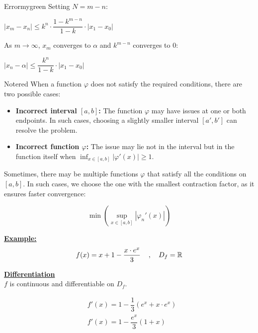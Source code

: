 \begin{prettyBox}{Error}{mygreen}
Setting \(N = m-n\):

\begin{center}
    \(|x_m - x_n| \leq k^{n} \cdot \dfrac{1-k^{m-n}}{1-k} \cdot| x_{1} - x_0|\)
\end{center}

As \(m \to \infty\), \(x_m\) converges to \(\alpha\) and \(k^{m-n}\) converges to 0:

\begin{center}
    \(\boxed{|x_n - \alpha| \leq \dfrac{k^n}{1-k} \cdot| x_{1} - x_0|}\)
\end{center}
\end{prettyBox}

\newpage

\begin{prettyBox}{Note}{red}
When a function \(\varphi\) does not satisfy the required conditions, there are two possible cases:  
\begin{itemize}
    \item \textbf{Incorrect interval \([a, b]\):} The function \(\varphi\) may have issues at one or both endpoints. In such cases, choosing a slightly smaller interval \([a', b']\) can resolve the problem.  
    \item \textbf{Incorrect function \(\varphi\):} The issue may lie not in the interval but in the function itself when \(\displaystyle\inf_{x \in [a, b]} |\varphi'(x)| \geq 1\).  
\end{itemize}


Sometimes, there may be multiple functions \(\varphi\) that satisfy all the conditions on \([a, b]\). In such cases, we choose the one with the smallest contraction factor, as it ensures faster convergence:  

\[
\min \left( \sup_{x \in [a, b]} |\varphi_n'(x)| \right)
\]
\end{prettyBox}

\vspace{0.75cm}

\textbf{\underline{Example:}}
\[
f(x) = x + 1 - \frac{x\cdot e^{x}}{3} \hspace{0.4cm}, \quad D_f = \mathbb{R}
\]

\vspace{0.5cm}
\textbf{\underline{Differentiation}}\\[0.2cm]
\( f \) is continuous and differentiable on \( D_f \).

\begin{center}
    \begin{align*}
        &f'(x) = 1 - \dfrac{1}{3}(e^{x}+x\cdot e^{x})\\[0.1cm] 
        &\boxed{f'(x) = 1 - \dfrac{e^{x}}{3}(1+x)}
    \end{align*}
\end{center}

